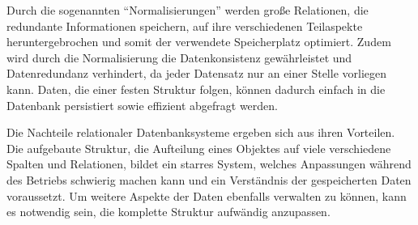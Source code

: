 Durch die sogenannten \enquote{Normalisierungen} werden große Relationen, die redundante Informationen speichern, auf ihre verschiedenen Teilaspekte heruntergebrochen und somit der verwendete Speicherplatz optimiert.
Zudem wird durch die Normalisierung die Datenkonsistenz gewährleistet und Datenredundanz verhindert, da jeder Datensatz nur an einer Stelle vorliegen kann.
Daten, die einer festen Struktur folgen, können dadurch einfach in die Datenbank persistiert sowie effizient abgefragt werden.

Die Nachteile relationaler Datenbanksysteme ergeben sich aus ihren Vorteilen.
Die aufgebaute Struktur, die Aufteilung eines Objektes auf viele verschiedene Spalten und Relationen, bildet ein starres System, welches Anpassungen während des Betriebs schwierig machen kann und ein Verständnis der gespeicherten Daten voraussetzt.
Um weitere Aspekte der Daten ebenfalls verwalten zu können, kann es notwendig sein, die komplette Struktur aufwändig anzupassen.
